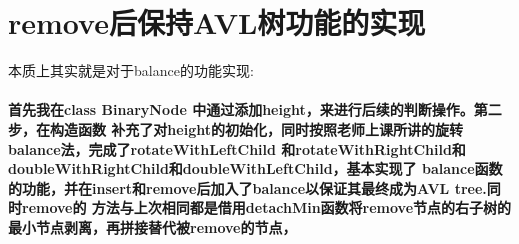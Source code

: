 \documentclass[UTF8]{ctexart}
\begin{document}
\pagestyle{fancy}
\fancyhead{}
\setlength{\headheight}{12.64723pt}

\section{remove后保持AVL树功能的实现}
本质上其实就是对于balance的功能实现:\par

\paragraph{
首先我在class BinaryNode 中通过添加height，来进行后续的判断操作。第二步，在构造函数
补充了对height的初始化，同时按照老师上课所讲的旋转balance法，完成了rotateWithLeftChild
和rotateWithRightChild和doubleWithRightChild和doubleWithLeftChild，基本实现了
balance函数的功能，并在insert和remove后加入了balance以保证其最终成为AVL tree.同时remove的
方法与上次相同都是借用detachMin函数将remove节点的右子树的最小节点剥离，再拼接替代被remove的节点，}
\end{document}
